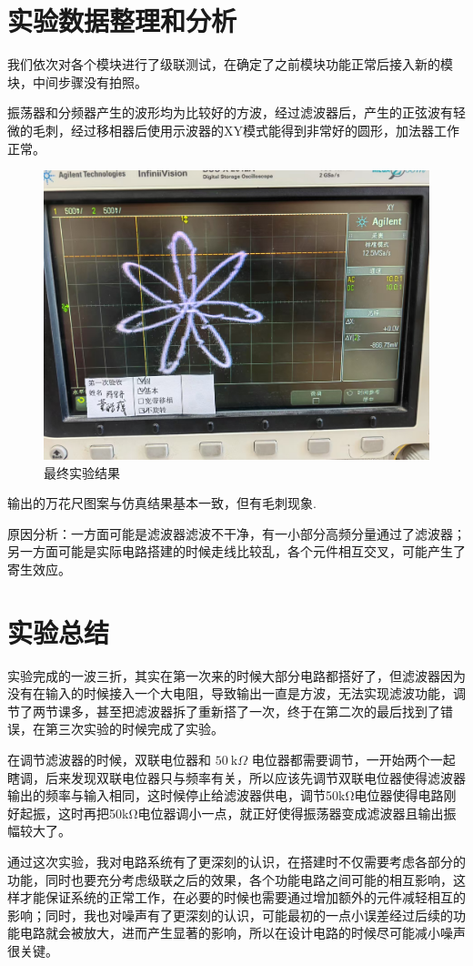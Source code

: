 \documentclass[utf8,twocolumn]{article}
\begin{document}
\section{实验数据整理和分析}
我们依次对各个模块进行了级联测试，在确定了之前模块功能正常后接入新的模块，中间步骤没有拍照。
\par
振荡器和分频器产生的波形均为比较好的方波，经过滤波器后，产生的正弦波有轻微的毛刺，经过移相器后使用示波器的XY模式能得到非常好的圆形，加法器工作正常。
\begin{figure}[H]
    \centering
    \includegraphics[width=0.8\linewidth]{images/result.jpg}
    \caption{最终实验结果}
    \label{plot:final-result}
\end{figure}
输出的万花尺图案与仿真结果基本一致，但有毛刺现象.
\par
原因分析：一方面可能是滤波器滤波不干净，有一小部分高频分量通过了滤波器；另一方面可能是实际电路搭建的时候走线比较乱，各个元件相互交叉，可能产生了寄生效应。

\section{实验总结}
实验完成的一波三折，其实在第一次来的时候大部分电路都搭好了，但滤波器因为没有在输入的时候接入一个大电阻，导致输出一直是方波，无法实现滤波功能，调节了两节课多，甚至把滤波器拆了重新搭了一次，终于在第二次的最后找到了错误，在第三次实验的时候完成了实验。
\par
在调节滤波器的时候，双联电位器和 $ 50~\mathrm{k}\Omega $ 电位器都需要调节，一开始两个一起瞎调，后来发现双联电位器只与频率有关，所以应该先调节双联电位器使得滤波器输出的频率与输入相同，这时候停止给滤波器供电，调节50kΩ电位器使得电路刚好起振，这时再把50kΩ电位器调小一点，就正好使得振荡器变成滤波器且输出振幅较大了。
\par
通过这次实验，我对电路系统有了更深刻的认识，在搭建时不仅需要考虑各部分的功能，同时也要充分考虑级联之后的效果，各个功能电路之间可能的相互影响，这样才能保证系统的正常工作，在必要的时候也需要通过增加额外的元件减轻相互的影响；同时，我也对噪声有了更深刻的认识，可能最初的一点小误差经过后续的功能电路就会被放大，进而产生显著的影响，所以在设计电路的时候尽可能减小噪声很关键。



\appendix
\onecolumn


\end{document}
